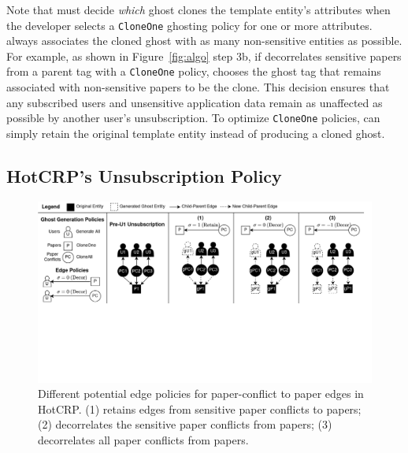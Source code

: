 Note that \sys must decide \emph{which} ghost clones the template entity's attributes when the
developer selects a \texttt{CloneOne} ghosting policy for one or more attributes. \sys always
associates the cloned ghost with as many non-sensitive entities as possible. For example, as shown
in Figure~\ref{fig:algo} step 3b, if \sys decorrelates sensitive papers from a parent tag with a
\texttt{CloneOne} policy, \sys chooses the ghost tag that remains associated with non-sensitive
papers to be the clone. This decision ensures that any subscribed users and unsensitive application
data remain as unaffected as possible by another user's unsubscription. To optimize
\texttt{CloneOne} policies, \sys can simply retain the original template entity instead of producing
a cloned ghost.

\subsection{HotCRP's Unsubscription Policy}
\label{sec:hotcrp_example}

\begin{figure}[ht!]
    \centering
    \includegraphics[width=\textwidth]{img/pcs}

    \caption{Different potential edge policies for paper-conflict to paper edges in HotCRP.
    (1) retains edges from sensitive paper conflicts to papers; (2) decorrelates the sensitive
    paper conflicts from papers; (3) decorrelates all paper conflicts from papers.}
    \label{fig:hotcrp}
\end{figure}

